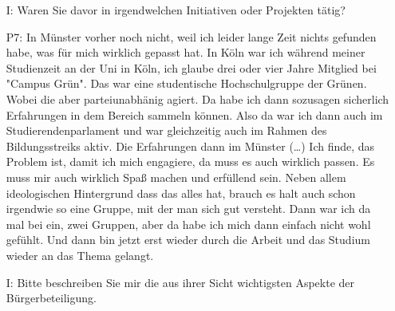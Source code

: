 \begin{itemize}
    Und dementsprechend bin ich eigentlich seit dem Anfang dann dabei und habe auch relativ regelm{\"a}{\ss}ig an den Treffen teilgenommen. Ich habe vielleicht so zwei oder drei ausgesetzt, weil ich da einfach pers{\"o}nlich keine Zeit hatte, war aber immer dar{\"u}ber informiert wie es weiter ging, weil wir halt auch die Dokumentation des Prozesses gr{\"o}{\ss}tenteils gemacht haben. Das hei{\ss}, wir haben dann auch immer die Protokolle der einzelnen Treffen verschriftlicht und hochgeladen, und so was. Auf unsere Internetseite. Wir haben da eine Internetplattform, schon ein Jahr vorher, gegr{\"u}ndet auf Initiative von [Dozent 1]. Bei dieser geht es darum, dass eine st{\"a}rkere Vernetzung zwischen Zivilgesellschaft und Wissenschaftlichkeit geschaffen werden soll. Wo wir halt schon einige Grundlagen dann auch gelegt haben. Da gibt es dann zum Beispiel Informationsmaterial, da gibt es das Transition Wiki in dem regionale Akteure schon aufgez{\"a}hlt sind, die durchaus eine Rolle spielen k{\"o}nnen. Also einzelne Gruppen, die kurz beschrieben. Aber auch Konzepte einf{\"u}hrend erl{\"a}utert. Wie "Postwachstum" oder "Nachhaltigkeit - Was hei{\ss}t das eigentlich?".
    \item[I:] Waren Sie davor in irgendwelchen Initiativen oder Projekten t{\"a}tig?
    \item[P7:] In M{\"u}nster vorher noch nicht, weil ich leider lange Zeit nichts gefunden habe, was f{\"u}r mich wirklich gepasst hat. In K{\"o}ln war ich w{\"a}hrend meiner Studienzeit an der Uni in K{\"o}ln, ich glaube drei oder vier Jahre Mitglied bei "Campus Gr{\"u}n". Das war eine studentische Hochschulgruppe der Gr{\"u}nen. Wobei die aber parteiunabh{\"a}nig agiert. Da habe ich dann sozusagen sicherlich Erfahrungen in dem Bereich sammeln k{\"o}nnen. Also da war ich dann auch im Studierendenparlament und war gleichzeitig auch im Rahmen des Bildungsstreiks aktiv. Die Erfahrungen dann im M{\"u}nster (\dots) Ich finde, das Problem ist, damit ich mich engagiere, da muss es auch wirklich passen. Es muss mir auch wirklich Spa{\ss} machen und erf{\"u}llend sein. Neben allem ideologischen Hintergrund dass das alles hat, brauch es halt auch schon irgendwie so eine Gruppe, mit der man sich gut versteht. Dann war ich da mal bei ein, zwei Gruppen, aber da habe ich mich dann einfach nicht wohl gef{\"u}hlt. Und dann bin jetzt erst wieder durch die Arbeit und das Studium wieder an das Thema gelangt.
    \item[I:] Bitte beschreiben Sie mir die aus ihrer Sicht wichtigsten Aspekte der B{\"u}rgerbeteiligung.

\end{itemize}

